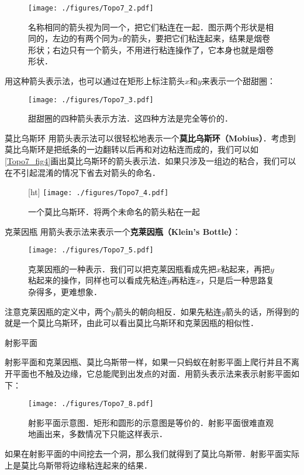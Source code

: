 \begin{figure}[ht]
\centering
\texttt{[image: ./figures/Topo7\_2.pdf]}
\caption{名称相同的箭头视为同一个，把它们粘连在一起．图示两个形状是相同的，左边的有两个同为$x$的箭头，要把它们粘连起来，结果是烟卷形状；右边只有一个箭头，不用进行粘连操作了，它本身也就是烟卷形状．} \label{Topo7_fig2}
\end{figure}

用这种箭头表示法，也可以通过在矩形上标注箭头$x$和$y$来表示一个甜甜圈：

\begin{figure}[ht]
\centering
\texttt{[image: ./figures/Topo7\_3.pdf]}
\caption{甜甜圈的四种箭头表示方法．这四种方法是完全等价的．} \label{Topo7_fig3}
\end{figure}

\begin{example}{莫比乌斯环}
用箭头表示法可以很轻松地表示一个\textbf{莫比乌斯环（Mobius）}．考虑到莫比乌斯环是把纸条的一边翻转以后再和对边粘连而成的，我们可以如\autoref{Topo7_fig4}画出莫比乌斯环的箭头表示法．如果只涉及一组边的粘合，我们可以在不引起混淆的情况下省去对箭头的命名．

\begin{figure}\label{Topo7_fig6}[ht]
\centering
\texttt{[image: ./figures/Topo7\_4.pdf]}
\caption{一个莫比乌斯环．将两个未命名的箭头粘在一起} \label{Topo7_fig4}
\end{figure}

\end{example}



\begin{example}{克莱因瓶}
用箭头表示法来表示一个\textbf{克莱因瓶（Klein's Bottle）}：
\begin{figure}[ht]
\centering
\texttt{[image: ./figures/Topo7\_5.pdf]}
\caption{克莱因瓶的一种表示．我们可以把克莱因瓶看成先把$x$粘起来，再把$y$粘起来的操作，同样也可以看成先粘连$y$再粘连$x$，只是后一种思路复杂得多，更难想象．} \label{Topo7_fig5}
\end{figure}

注意克莱因瓶的定义中，两个$y$箭头的朝向相反．如果先粘连$y$箭头的话，所得到的就是一个莫比乌斯环，由此可以看出莫比乌斯环和克莱因瓶的相似性．

\end{example}

\begin{example}{射影平面}

射影平面和克莱因瓶、莫比乌斯带一样，如果一只蚂蚁在射影平面上爬行并且不离开平面也不触及边缘，它总能爬到出发点的对面．用箭头表示法来表示射影平面如下：

\begin{figure}[ht]
\centering
\texttt{[image: ./figures/Topo7\_8.pdf]}
\caption{射影平面示意图．矩形和圆形的示意图是等价的．射影平面很难直观地画出来，多数情况下只能这样表示．} \label{Topo7_fig8}
\end{figure}

如果在射影平面的中间挖去一个洞，那么我们就得到了莫比乌斯带．射影平面实际上是莫比乌斯带将边缘粘连起来的结果．

\end{example}

